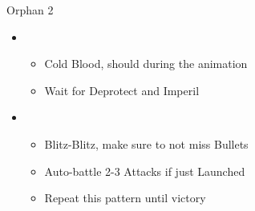 \begin{battle}[1:05]{Orphan 2}
\begin{multicols}{2}
\begin{itemize}
\begin{itemize}
\begin{itemize}
					\item Auto-chain 2 spells
				      \end{itemize}
				      \item Shift after Snow's fifth spell
			      \end{itemize}
			\item \fifth
			\begin{itemize}
				\item Cold Blood, should \stagger during the animation
				\item Wait for Deprotect and Imperil
			\end{itemize}
			\item \fourth
			      \begin{itemize}
				      \item Blitz-Blitz, make sure to not miss Bullets
				      \item Auto-battle 2-3 Attacks if just Launched
				      \item Repeat this pattern until victory
			      \end{itemize}
		\end{itemize}
	\end{multicols}
\end{battle}
